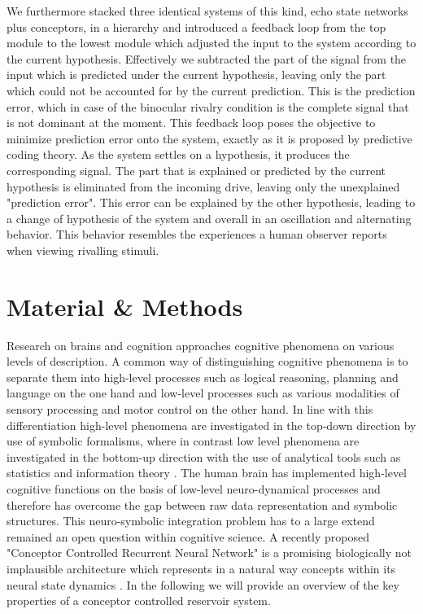 \documentclass[utf8]{frontiersSCNS} %
\begin{document}
    
    We furthermore stacked three identical systems of this kind, echo state networks plus conceptors, in a hierarchy and introduced a feedback loop 
    from the top module to the lowest module which adjusted the input to the system according to the current hypothesis. 
    Effectively we subtracted the part of the signal from the input which is predicted under the current hypothesis, 
    leaving only the part which could not be accounted for by the current prediction. This is the prediction error, 
    which in case of the binocular rivalry condition is the complete signal that is not dominant at the moment. 
    This feedback loop poses the objective to minimize prediction error onto the system, exactly as it is proposed by predictive coding theory. 
    As the system settles on a hypothesis, it produces the corresponding signal. The part that is explained or predicted by the current hypothesis 
    is eliminated from the incoming drive, leaving only the unexplained "prediction error". This error can be explained by the other hypothesis, 
    leading to a change of hypothesis of the system and overall in an oscillation and alternating behavior. 
    This behavior resembles the experiences a human observer reports when viewing rivalling stimuli. 

\section{Material \& Methods}

Research on brains and cognition approaches cognitive phenomena on various levels of description. A common way of distinguishing cognitive phenomena is to separate them into high-level processes such as logical reasoning, planning and language on the one hand and low-level processes such as various modalities of sensory processing and motor control on the other hand. In line with this differentiation high-level phenomena are investigated in the top-down direction by use of symbolic formalisms, where in contrast low level phenomena are investigated in the bottom-up direction with the use of analytical tools such as statistics and information theory \cite{Gaehde2014, Jaeger2014}. The human brain has implemented high-level cognitive functions on the basis of low-level neuro-dynamical processes and therefore has overcome the gap between raw data representation and symbolic structures. This neuro-symbolic integration problem has to a large extend remained an open question within cognitive science. A recently proposed "Conceptor Controlled Recurrent Neural Network" is a promising biologically not implausible architecture which represents in a natural way concepts within its neural state dynamics \cite{Jaeger2014}. In the following we will provide an overview of the key properties of a conceptor controlled reservoir system.
    
\end{document}
